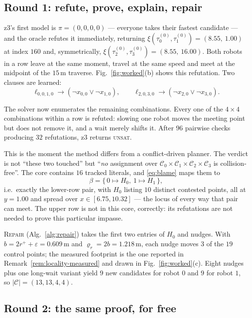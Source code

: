 \documentclass[conference]{IEEEtran}
\newcommand{\Cand}{\mathcal{C}}
\newcommand{\clr}{\varepsilon}
\begin{document}
\subsection{Round 1: refute, prove, explain, repair}

z3's first model is $\pi = (0,0,0,0)$ --- everyone takes their fastest candidate --- and the
oracle refutes it immediately, returning
$\xi(\tau_0^{(0)},\tau_1^{(0)}) = (8.55,\ 1.00)$ at index $160$ and, symmetrically,
$\xi(\tau_2^{(0)},\tau_3^{(0)}) = (8.55,\ 16.00)$. Both robots in a row leave at the same
moment, travel at the same speed and meet at the midpoint of the $15$\,m traverse.
Fig.~\ref{fig:worked}(b) shows this refutation. Two clauses are learned:
\[
  \ell_{0,0,1,0} \rightarrow (\neg x_{0,0} \vee \neg x_{1,0}),
  \qquad
  \ell_{2,0,3,0} \rightarrow (\neg x_{2,0} \vee \neg x_{3,0}).
\]

The solver now enumerates the remaining combinations. Every one of the $4 \times 4$
combinations within a row is refuted: slowing one robot moves the meeting point but does not
remove it, and a wait merely shifts it. After $96$ pairwise checks producing $32$
refutations, z3 returns \textsc{unsat}.

This is the moment the method differs from a conflict-driven planner. The verdict is not
``these two touched'' but ``\emph{no} assignment over
$\Cand_0\times\Cand_1\times\Cand_2\times\Cand_3$ is collision-free''. The core contains
$16$ tracked literals, and \eqref{eq:blame} maps them to
\[
  \beta = \{\, 0 \mapsto H_0,\ 1 \mapsto H_1 \,\},
\]
i.e.\ exactly the lower-row pair, with $H_0$ listing $10$ distinct contested points, all at
$y = 1.00$ and spread over $x \in [6.75, 10.32]$ --- the locus of every way that pair can
meet. The upper row is not in this core, correctly: its refutations are not needed to prove
this particular impasse.

\textsc{Repair} (Alg.~\ref{alg:repair}) takes the first two entries of $H_0$ and nudges.
With $b = 2r^{+} + \clr = 0.609$\,m and $\varrho_r = 2b = 1.218$\,m, each nudge moves $3$ of
the $19$ control points; the measured footprint is the one reported in
Remark~\ref{rem:locality-measured} and drawn in Fig.~\ref{fig:worked}(c). Eight nudges plus
one long-wait variant yield $9$ new candidates for robot $0$ and $9$ for robot $1$, so
$|\Cand| = (13,13,4,4)$.

\subsection{Round 2: the same proof, for free}
\end{document}
